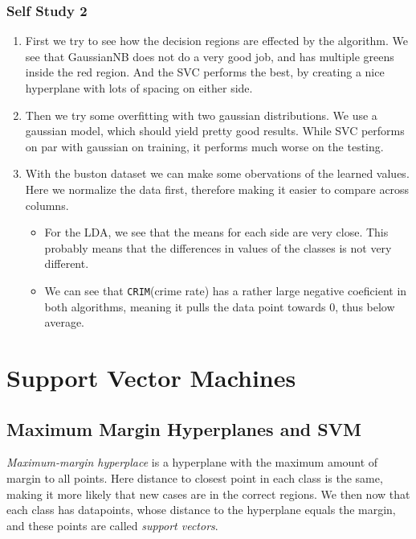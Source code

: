 \subsubsection{Self Study 2}

\begin{enumerate}
    \item First we try to see how the decision regions are effected by the algorithm.
        We see that GaussianNB does not do a very good job, and has multiple greens inside the red region.
        And the SVC performs the best, by creating a nice hyperplane with lots of spacing on either side.
    \item Then we try some overfitting with two gaussian distributions.
        We use a gaussian model, which should yield pretty good results.
        While SVC performs on par with gaussian on training, it performs much worse on the testing.
    \item With the buston dataset we can make some obervations of the learned values.
        Here we normalize the data first, therefore making it easier to compare across columns.
        \begin{itemize}
            \item For the LDA, we see that the means for each side are very close. This probably means that the differences in values of the classes is not very different.
            \item We can see that \texttt{CRIM}(crime rate) has a rather large negative coeficient in both algorithms, meaning it pulls the data point towards $0$, thus below average.
        \end{itemize}
\end{enumerate}

\section{Support Vector Machines}

\subsection{Maximum Margin Hyperplanes and SVM}

\emph{Maximum-margin hyperplace} is a hyperplane with the maximum amount of margin to all points.
Here distance to closest point in each class is the same, making it more likely that new cases are in the correct regions.
We then now that each class has datapoints, whose distance to the hyperplane equals the margin, and these points are called \emph{support vectors}.

